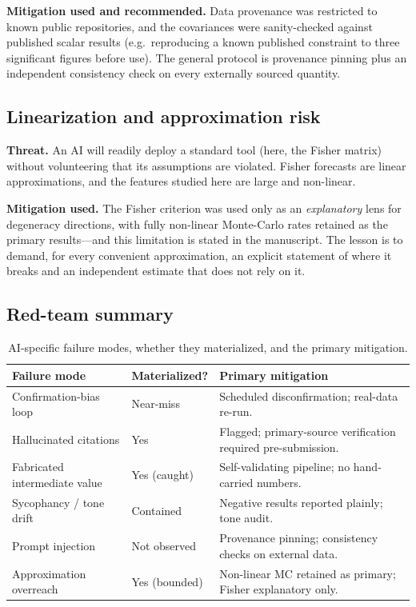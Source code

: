 \documentclass[11pt]{article}
\begin{document}
\textbf{Mitigation used and recommended.} Data provenance was restricted to known
public repositories, and the covariances were sanity-checked against published
scalar results (e.g.\ reproducing a known published constraint to three significant
figures before use). The general protocol is provenance pinning plus an independent
consistency check on every externally sourced quantity.

\subsection{Linearization and approximation risk}

\textbf{Threat.} An AI will readily deploy a standard tool (here, the Fisher matrix)
without volunteering that its assumptions are violated. Fisher forecasts are linear
approximations, and the features studied here are large and non-linear.

\textbf{Mitigation used.} The Fisher criterion was used only as an
\emph{explanatory} lens for degeneracy directions, with fully non-linear Monte-Carlo
rates retained as the primary results---and this limitation is stated in the
manuscript. The lesson is to demand, for every convenient approximation, an explicit
statement of where it breaks and an independent estimate that does not rely on it.

\subsection{Red-team summary}

\begin{table}[h]
\centering
\caption{AI-specific failure modes, whether they materialized, and the primary
mitigation.}
\label{tab:redteam}
\begin{tabular}{@{}p{}p{}p{}@{}}
\toprule
Failure mode & Materialized? & Primary mitigation \\
\midrule
Confirmation-bias loop & Near-miss & Scheduled disconfirmation; real-data re-run. \\
Hallucinated citations & Yes & Flagged; primary-source verification required pre-submission. \\
Fabricated intermediate value & Yes (caught) & Self-validating pipeline; no hand-carried numbers. \\
Sycophancy / tone drift & Contained & Negative results reported plainly; tone audit. \\
Prompt injection & Not observed & Provenance pinning; consistency checks on external data. \\
Approximation overreach & Yes (bounded) & Non-linear MC retained as primary; Fisher explanatory only. \\
\bottomrule
\end{tabular}
\end{table}
\end{document}
